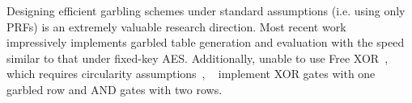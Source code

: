 Designing efficient garbling schemes under standard assumptions (i.e. using only PRFs) is an extremely valuable research direction.  Most recent work~\cite{CCS:GLNP15} impressively implements garbled table generation and evaluation with the speed similar to that under fixed-key AES.  Additionally, unable to use Free XOR~\cite{ICALP:KolSch08}, which requires circularity assumptions~\cite{TCC:CKKZ12}, ~\cite{CCS:GLNP15} implement XOR gates with one garbled row and AND gates with two rows.



